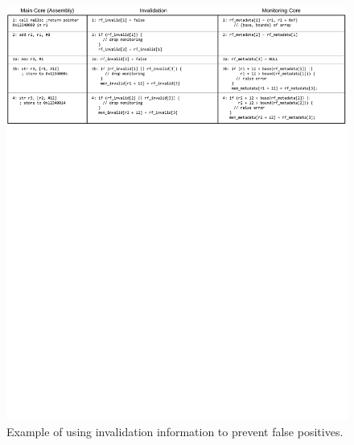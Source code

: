 \begin{figure}
  \begin{center}
    \includegraphics[]{figs/example_invalid.pdf}
    \caption{Example of using invalidation information to prevent false positives.}
    \label{fig:dropping.example_invalid}
    \vspace{-0.1in}
  \end{center}
\end{figure}

